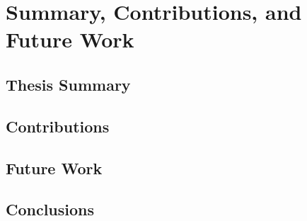 \chapter{Summary, Contributions, and Future Work}
\label{chapter6}

\section{Thesis Summary}

\section{Contributions}

\section{Future Work}

\section{Conclusions}
